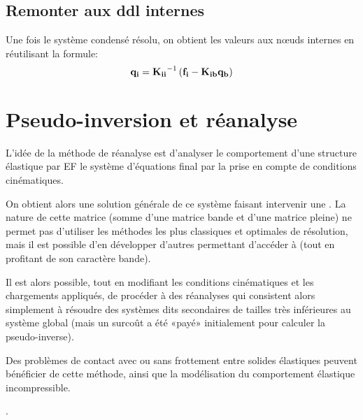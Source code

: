 \medskip
\subsection{Remonter aux ddl internes}
Une fois le système condensé résolu, on obtient les valeurs aux nœuds
internes en réutilisant la formule:
\begin{equation}
\VV{q_i} = \MMI{K_{ii}}\left(\VV{f_i}-\MM{K_{ib}}\VV{q_b}\right)
\end{equation}

\medskip
\section{Pseudo-inversion et réanalyse}\label{Sec-PInv}

\medskip
L'idée de la méthode de réanalyse est d'analyser le comportement d'une structure
élastique par EF  le système d'équations final par la prise en
compte de conditions cinématiques.

On obtient alors une solution générale de ce système faisant intervenir une
. La nature de cette matrice (somme
d'une matrice bande et d'une matrice pleine) ne permet pas d'utiliser les méthodes
les plus classiques et optimales de résolution, mais il est possible d'en développer d'autres
permettant d'accéder à  (tout en profitant de son caractère bande).

Il est alors possible, tout en modifiant les conditions cinématiques et les chargements appliqués,
de procéder à des réanalyses qui consistent alors simplement à résoudre des systèmes
dits secondaires de tailles très inférieures au système global (mais un surcoût a été
«payé» initialement pour calculer la pseudo-inverse).

Des problèmes de contact avec ou sans frottement entre solides élastiques peuvent
bénéficier de cette méthode, ainsi que la modélisation du comportement élastique
incompressible.

\medskip
{}.


